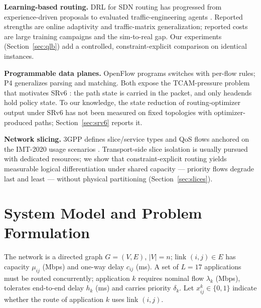 \documentclass[journal]{IEEEtran}
\begin{document}
\textbf{Learning-based routing.} DRL for SDN routing has progressed from
experience-driven proposals \cite{xu2018experience,stampa2017drl} to
evaluated traffic-engineering agents \cite{almasan2022drl}. Reported
strengths are online adaptivity and traffic-matrix generalization; reported
costs are large training campaigns and the sim-to-real gap. Our experiments
(Section~\ref{sec:qlb}) add a controlled, constraint-explicit comparison on
identical instances.

\textbf{Programmable data planes.} OpenFlow \cite{mckeown2008} programs
switches with per-flow rules; P4 \cite{bosshart2014} generalizes parsing and
matching. Both expose the TCAM-pressure problem that motivates SRv6
\cite{rfc8402,rfc8754,rfc8986,rfc9256}: the path state is carried in the
packet, and only headends hold policy state. To our knowledge, the state
reduction of routing-optimizer output under SRv6 has not been measured on
fixed topologies with optimizer-produced paths; Section~\ref{sec:srv6}
reports it.

\textbf{Network slicing.} 3GPP defines slice/service types and QoS flows
\cite{3gpp-ts23501} anchored on the IMT-2020 usage scenarios
\cite{itu-m2083}. Transport-side slice isolation is usually pursued with
dedicated resources; we show that constraint-explicit routing yields
measurable logical differentiation under shared capacity --- priority flows
degrade last and least --- without physical partitioning
(Section~\ref{sec:slices}).

\section{System Model and Problem Formulation}
\label{sec:model}
The network is a directed graph $G=(V,E)$, $|V|=n$; link $(i,j)\in E$ has
capacity $\mu_{ij}$ (Mbps) and one-way delay $c_{ij}$ (ms). A set of $L=17$
applications must be routed concurrently; application $k$ requires nominal
flow $\lambda_k$ (Mbps), tolerates end-to-end delay $h_k$ (ms) and carries
priority $\delta_k$. Let $x_{ij}^{k}\in\{0,1\}$ indicate whether the route of
application $k$ uses link $(i,j)$.
\end{document}
